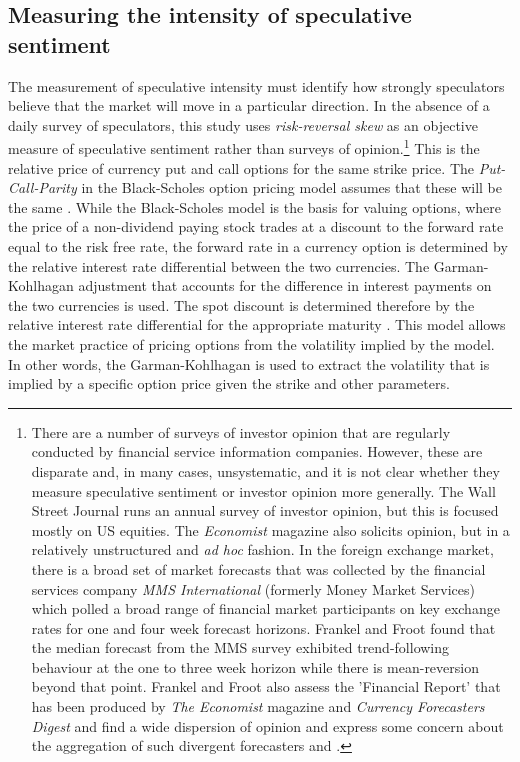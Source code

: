 \documentclass[12pt, a4paper, oneside]{article} %
\begin{document}
\subsection{Measuring the intensity of speculative sentiment}
The measurement of speculative intensity must identify how strongly speculators believe that the market will move in a particular direction. In the absence of a daily survey of speculators, this study uses \emph{risk-reversal skew} as an objective measure of speculative sentiment rather than surveys of opinion.\footnote{There are a number of surveys of investor opinion that are regularly conducted by financial service information companies.  However, these are disparate and, in many cases, unsystematic, and it is not clear whether they measure speculative sentiment or investor opinion more generally.   The Wall Street Journal runs an annual survey of investor opinion, but this is focused mostly on US equities.  The \emph{Economist} magazine also solicits opinion, but in a relatively unstructured and \emph{ad hoc} fashion.  In the foreign exchange market, there is a broad set of market forecasts that was collected by the financial services company \emph{MMS International} (formerly Money Market Services) which polled a broad range of financial market participants on key exchange rates for one and four week forecast horizons. Frankel and Froot found that the median forecast from the MMS survey exhibited trend-following behaviour at the one to three week horizon while there is mean-reversion beyond that point.  Frankel and Froot also assess the 'Financial Report' that has been produced by \emph{The Economist} magazine and \emph{Currency Forecasters Digest} and find a wide dispersion of opinion and express some concern about the aggregation of such divergent forecasters \citep{FrootFrankelFDB} and \citep{FrankelFroot1987} \label{fnsurvey}.}    This is the relative price of currency put and call options for the same strike price.  The \emph{Put-Call-Parity} in the Black-Scholes option pricing model assumes that these will be the same \citep{Black1973Options}.  While the Black-Scholes model is the basis for valuing options, where the price of a non-dividend paying stock trades at a discount to the forward rate equal to the risk free rate, the forward rate in a currency option is determined by the relative interest rate differential between the two currencies.   The Garman-Kohlhagan adjustment that accounts for the difference in interest payments on the two currencies is used.   The spot discount is determined therefore by the relative interest rate differential for the appropriate maturity \citep{GarmanKohlhagan}.   This model allows the market practice of pricing options from the volatility implied by the model.  In other words, the Garman-Kohlhagan is used to extract the volatility that is implied by a specific option price given the strike and other parameters. 
 
\end{document}
